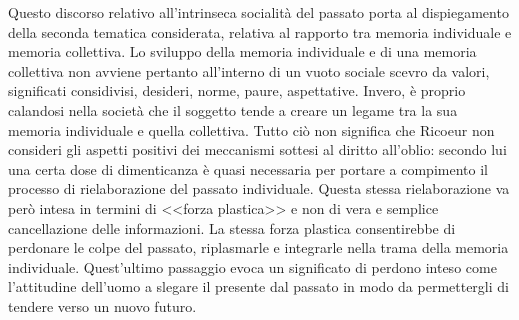 Questo discorso relativo all'intrinseca socialità del passato porta al dispiegamento della seconda tematica considerata, relativa al rapporto tra memoria individuale e memoria collettiva.
Lo sviluppo della memoria individuale e di una memoria collettiva non avviene pertanto all'interno di un vuoto sociale scevro da valori, significati considivisi, desideri, norme, paure, aspettative. Invero, è proprio calandosi nella società che il soggetto tende a creare un legame tra la sua memoria individuale e quella collettiva. Tutto ciò non significa che Ricoeur non consideri gli aspetti positivi dei meccanismi sottesi al diritto all'oblio: secondo lui una certa dose di dimenticanza è quasi necessaria per portare  a compimento il processo di rielaborazione del passato individuale. Questa stessa rielaborazione va però intesa in termini di <<forza plastica>> e non di vera e semplice cancellazione delle informazioni. La stessa forza plastica consentirebbe di perdonare le colpe del passato, riplasmarle e integrarle nella trama della memoria individuale. Quest'ultimo passaggio evoca un significato di perdono inteso come l'attitudine dell'uomo a slegare il presente dal passato in modo da permettergli di tendere verso un nuovo futuro.

